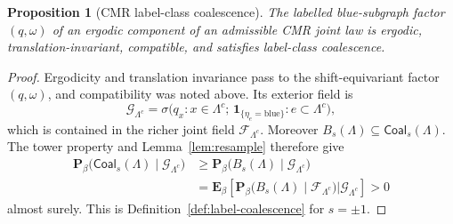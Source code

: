 \documentclass[11pt]{article}
\newtheorem{proposition}[theorem]{Proposition}
\numberwithin{theorem}{section}
\theoremstyle{remark}
\begin{document}
\begin{proposition}[CMR label-class coalescence]\label{prop:cmr-label-coalescence}
The labelled blue-subgraph factor $(q,\omega)$ of an ergodic component of an admissible CMR joint law is ergodic, translation-invariant, compatible, and satisfies label-class coalescence.
\end{proposition}

\begin{proof}
Ergodicity and translation invariance pass to the shift-equivariant factor $(q,\omega)$, and compatibility was noted above.
Its exterior field is
\[
  \mathscr{G}_{\Lambda^c}
  =\sigma\bigl(q_x:x\in\Lambda^c;\,
               \mathbf{1}_{\{\eta_e=\mathrm{blue}\}}:e\subset\Lambda^c\bigr),
\]
which is contained in the richer joint field $\mathscr{F}_{\Lambda^c}$.
Moreover $B_s(\Lambda)\subseteq\mathsf{Coal}_s(\Lambda)$.
The tower property and Lemma~\ref{lem:resample} therefore give
\begin{align*}
  \mathbf{P}_\beta\bigl(\mathsf{Coal}_s(\Lambda)
      \mid\mathscr{G}_{\Lambda^c}\bigr)
  &\geq \mathbf{P}_\beta\bigl(B_s(\Lambda)
      \mid\mathscr{G}_{\Lambda^c}\bigr)\\
  &=\mathbf{E}_\beta\!\left[
      \mathbf{P}_\beta\bigl(B_s(\Lambda)
          \mid\mathscr{F}_{\Lambda^c}\bigr)
      \mathrel{\big|}\mathscr{G}_{\Lambda^c}\right]>0
\end{align*}
almost surely.
This is Definition~\ref{def:label-coalescence} for $s=\pm1$.
\end{proof}
\end{document}
